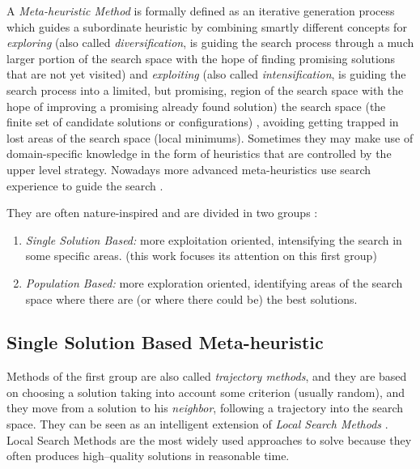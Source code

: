 A {\it Meta-heuristic Method} is formally defined as an iterative generation process which guides a subordinate heuristic by combining smartly different concepts for \textit{exploring} (also called \textit{diversification}, is guiding the search process through a much larger portion of the search space with the hope of finding promising solutions that are not yet visited) and \textit{exploiting} (also called \textit{intensification}, is guiding the search process into a limited, but promising, region of the search space with the hope of improving a promising already found solution) the search space (the finite set of candidate solutions or configurations) \cite{Osman1996}, avoiding getting trapped in lost areas of the search space (local minimums). Sometimes they may make use of domain-specific knowledge in the form of heuristics that are controlled by the upper level strategy. Nowadays more advanced meta-heuristics use search experience to guide the search \cite{Blum2003}.

They are often nature-inspired and are divided in two groups \cite{Boussaid2013}: 
\begin{enumerate}%
    \item {\it Single Solution Based:} more exploitation oriented, intensifying the search in some specific areas. (this work focuses its attention on this first group)
    \item {\it Population Based:} more exploration oriented, identifying areas of the search space where there are (or where there could be) the best solutions. %
\end{enumerate} %

\subsection{Single Solution Based Meta-heuristic}

Methods of the first group are also called {\it trajectory methods}, and they are based on choosing a solution taking into account some criterion (usually random), and they move from a solution to his \textit{neighbor}, following a trajectory into the search space. They can be seen as an intelligent extension of \textit{Local Search Methods} \cite{Boussaid2013}. Local Search Methods are the most widely used approaches to solve \COPs{} because they often produces high--quality solutions in reasonable time.
  
